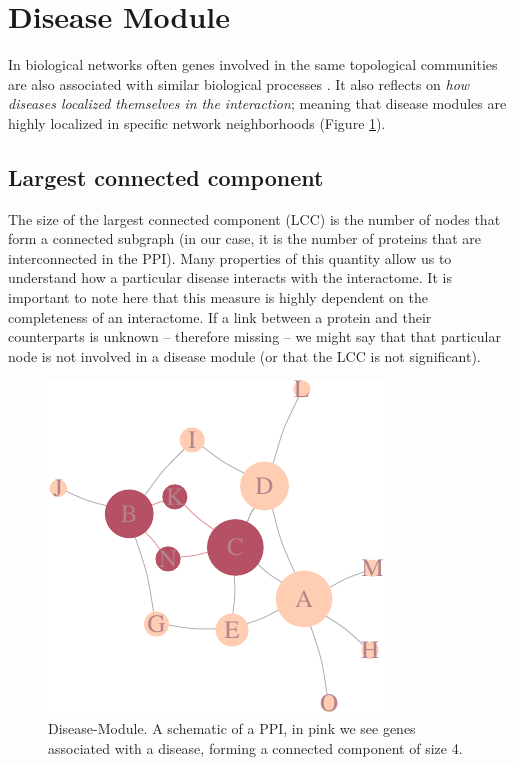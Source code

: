 \documentclass[
]{book}
\begin{document}
\hypertarget{diseasemodule}{%
\section{Disease Module}\label{diseasemodule}}

In biological networks often genes involved in the same topological communities are also associated with similar biological processes \citep{Ahn2010}. It also reflects on \emph{how diseases localized themselves in the interaction}; meaning that disease modules are highly localized in specific network neighborhoods \citep{Menche2015} (Figure \ref{fig:diseasemodule}).

\hypertarget{largest-connected-component}{%
\subsection{Largest connected component}\label{largest-connected-component}}

The size of the largest connected component (LCC) is the number of nodes that form a connected subgraph (in our case, it is the number of proteins that are interconnected in the PPI). Many properties of this quantity allow us to understand how a particular disease interacts with the interactome. It is important to note here that this measure is highly dependent on the completeness of an interactome. If a link between a protein and their counterparts is unknown -- therefore missing -- we might say that that particular node is not involved in a disease module (or that the LCC is not significant).

\begin{figure}
\centering
\includegraphics{NetMed_files/figure-latex/diseasemodule-1.pdf}
\caption{\label{fig:diseasemodule}Disease-Module. A schematic of a PPI, in pink we see genes associated with a disease, forming a connected component of size 4.}
\end{figure}
\end{document}
